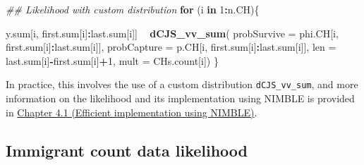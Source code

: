 \documentclass[
]{book}
\newenvironment{Shaded}{\begin{snugshade}}{\end{snugshade}}
\newcommand{\CommentTok}[1]{\textcolor[rgb]{0.56,0.35,0.01}{\textit{#1}}}
\newcommand{\ControlFlowTok}[1]{\textcolor[rgb]{0.13,0.29,0.53}{\textbf{#1}}}
\newcommand{\DataTypeTok}[1]{\textcolor[rgb]{0.13,0.29,0.53}{#1}}
\newcommand{\DecValTok}[1]{\textcolor[rgb]{0.00,0.00,0.81}{#1}}
\newcommand{\KeywordTok}[1]{\textcolor[rgb]{0.13,0.29,0.53}{\textbf{#1}}}
\newcommand{\NormalTok}[1]{#1}
\newcommand{\OperatorTok}[1]{\textcolor[rgb]{0.81,0.36,0.00}{\textbf{#1}}}
\newcommand{\StringTok}[1]{\textcolor[rgb]{0.31,0.60,0.02}{#1}}
\begin{document}
\begin{Shaded}
\begin{Highlighting}[]
\CommentTok{## Likelihood with custom distribution}
\ControlFlowTok{for}\NormalTok{ (i }\ControlFlowTok{in} \DecValTok{1}\OperatorTok{:}\NormalTok{n.CH)\{}

\NormalTok{  y.sum[i, first.sum[i]}\OperatorTok{:}\NormalTok{last.sum[i]] }\OperatorTok{~}\StringTok{ }\KeywordTok{dCJS_vv_sum}\NormalTok{(}
      \DataTypeTok{probSurvive =}\NormalTok{ phi.CH[i, first.sum[i]}\OperatorTok{:}\NormalTok{last.sum[i]],}
      \DataTypeTok{probCapture =}\NormalTok{ p.CH[i, first.sum[i]}\OperatorTok{:}\NormalTok{last.sum[i]],}
      \DataTypeTok{len =}\NormalTok{ last.sum[i]}\OperatorTok{-}\NormalTok{first.sum[i]}\OperatorTok{+}\DecValTok{1}\NormalTok{,}
      \DataTypeTok{mult =}\NormalTok{ CHs.count[i])}
\NormalTok{\}}
\end{Highlighting}
\end{Shaded}

In practice, this involves the use of a custom distribution \texttt{dCJS\_vv\_sum}, and more information on the likelihood and its implementation using NIMBLE is provided in \protect\hyperlink{ux5cux23ux5cux2520Efficientux5cux2520implementationux5cux2520usingux5cux2520NIMBLE}{Chapter 4.1 (Efficient implementation using NIMBLE)}.

\hypertarget{immigrant-count-data-likelihood}{%
\subsection{Immigrant count data likelihood}\label{immigrant-count-data-likelihood}}
\end{document}
